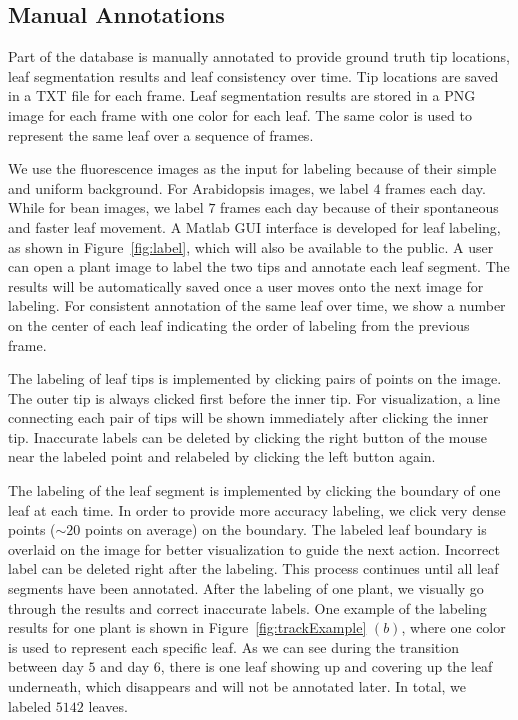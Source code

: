 \subsection{Manual Annotations}
Part of the database is manually annotated to provide ground truth tip locations, leaf segmentation results and leaf consistency over time.
Tip locations are saved in a TXT file for each frame.
Leaf segmentation results are stored in a PNG image for each frame with one color for each leaf.
The same color is used to represent the same leaf over a sequence of frames.

We use the fluorescence images as the input for labeling because of their simple and uniform background.
For Arabidopsis images, we label $4$ frames each day.
While for bean images, we label $7$ frames each day because of their spontaneous and faster leaf movement.
A Matlab GUI interface is developed for leaf labeling, as shown in Figure~\ref{fig:label}, which will also be available to the public.
A user can open a plant image to label the two tips and annotate each leaf segment.
The results will be automatically saved once a user moves onto the next image for labeling.
For consistent annotation of the same leaf over time, we show a number on the center of each leaf indicating the order of labeling from the previous frame.

The labeling of leaf tips is implemented by clicking pairs of points on the image.
The outer tip is always clicked first before the inner tip.
For visualization, a line connecting each pair of tips will be shown immediately after clicking the inner tip.
Inaccurate labels can be deleted by clicking the right button of the mouse near the labeled point and relabeled by clicking the left button again.

The labeling of the leaf segment is implemented by clicking the boundary of one leaf at each time.
In order to provide more accuracy labeling, we click very dense points ($\sim20$ points on average) on the boundary.
The labeled leaf boundary is overlaid on the image for better visualization to guide the next action.
Incorrect label can be deleted right after the labeling.
This process continues until all leaf segments have been annotated.
After the labeling of one plant, we visually go through the results and correct inaccurate labels.
One example of the labeling results for one plant is shown in Figure~\ref{fig:trackExample} $(b)$, where one color is used to represent each specific leaf.
As we can see during the transition between day $5$ and day $6$, there is one leaf showing up and covering up the leaf underneath, which disappears and will not be annotated later.
In total, we labeled $5142$ leaves.

